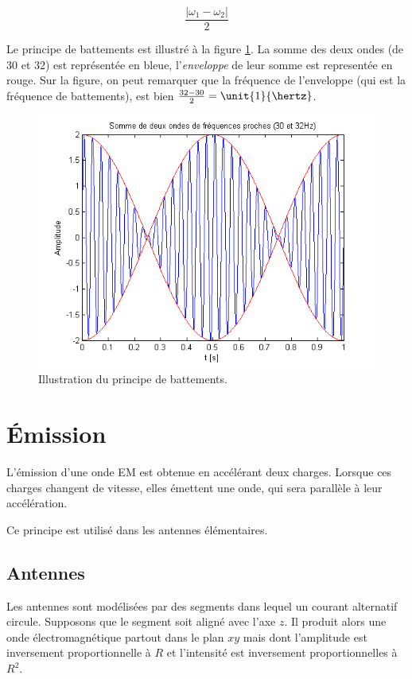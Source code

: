 $$\frac{|\omega_1 - \omega_2|}{2}$$

Le principe de battements est illustré à la figure \ref{fig:battements}.
La somme des deux ondes (de \unit{30}{\hertz} et \unit{32}{\hertz})
est représentée en bleue, l'\emph{enveloppe} de leur somme est representée en rouge.
Sur la figure, on peut remarquer que la fréquence de l'enveloppe (qui est la
fréquence de battements), est bien $\frac{32-30}{2} = \unit{1}{\hertz}$.

\begin{figure}[ht!]
	\centering
	\includegraphics[scale=0.8]{battements.png}
	\caption{Illustration du principe de battements.}
	\label{fig:battements}
\end{figure}

\section{Émission}
L'émission d'une onde EM est obtenue en accélérant deux charges.
Lorsque ces charges changent de vitesse, elles émettent une onde, qui sera
parallèle à leur accélération.

Ce principe est utilisé dans les antennes élémentaires.

\subsection{Antennes}
Les antennes sont modélisées par des segments dans lequel un courant
alternatif circule.
Supposons que le segment soit aligné avec l'axe $z$.
Il produit alors une onde électromagnétique partout dans le plan $xy$ mais
dont l'amplitude est inversement proportionnelle à $R$ et l'intensité
est inversement proportionnelles à $R^2$.

